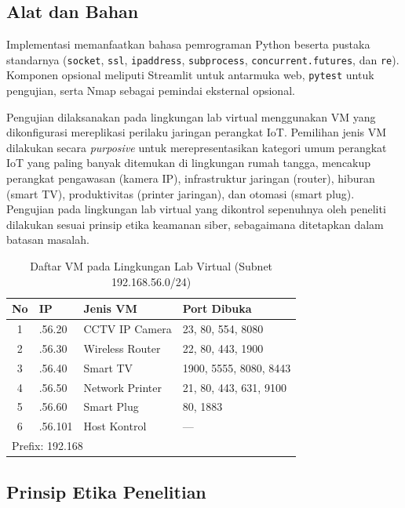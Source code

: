 \documentclass[conference]{IEEEtran}
\begin{document}
\subsection{Alat dan Bahan}

Implementasi memanfaatkan bahasa pemrograman Python beserta pustaka
standarnya (\texttt{socket}, \texttt{ssl}, \texttt{ipaddress},
\texttt{subprocess}, \texttt{concurrent.futures}, dan \texttt{re}).
Komponen opsional meliputi Streamlit untuk antarmuka web, \texttt{pytest}
untuk pengujian, serta Nmap sebagai pemindai eksternal opsional.

Pengujian dilaksanakan pada lingkungan lab virtual menggunakan VM yang
dikonfigurasi mereplikasi perilaku jaringan perangkat IoT. Pemilihan
jenis VM dilakukan secara \textit{purposive} untuk merepresentasikan
kategori umum perangkat IoT yang paling banyak ditemukan di lingkungan
rumah tangga, mencakup perangkat pengawasan (kamera IP), infrastruktur
jaringan (router), hiburan (smart TV), produktivitas (printer jaringan),
dan otomasi (smart plug). Pengujian pada lingkungan lab virtual yang
dikontrol sepenuhnya oleh peneliti dilakukan sesuai prinsip etika
keamanan siber, sebagaimana ditetapkan dalam batasan masalah.

\begin{table}[htbp]
\caption{Daftar VM pada Lingkungan Lab Virtual (Subnet 192.168.56.0/24)}
\label{tab:device_list}
\renewcommand{\arraystretch}{1.2}
\begin{tabularx}{\columnwidth}{|c|l|l|X|}
\hline
\textbf{No} & \textbf{IP} & \textbf{Jenis VM} & \textbf{Port Dibuka} \\
\hline
1 & .56.20  & CCTV IP Camera  & 23, 80, 554, 8080 \\
\hline
2 & .56.30  & Wireless Router & 22, 80, 443, 1900 \\
\hline
3 & .56.40  & Smart TV        & 1900, 5555, 8080, 8443 \\
\hline
4 & .56.50  & Network Printer & 21, 80, 443, 631, 9100 \\
\hline
5 & .56.60  & Smart Plug      & 80, 1883 \\
\hline
6 & .56.101 & Host Kontrol    & --- \\
\hline
\multicolumn{4}{l}{\small Prefix: 192.168} \\
\end{tabularx}
\end{table}

\subsection{Prinsip Etika Penelitian}
\end{document}
